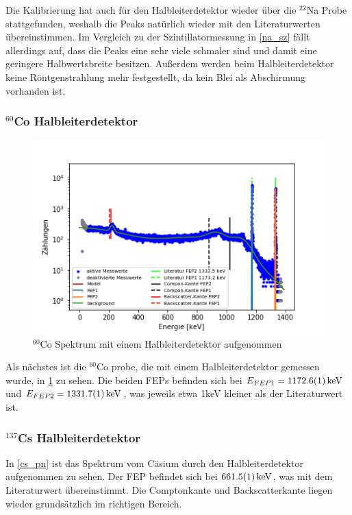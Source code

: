 Die Kalibrierung hat auch für den Halbleiterdetektor wieder über die $^{22}$Na Probe stattgefunden, weshalb die Peaks natürlich wieder mit den Literaturwerten übereinstimmen. Im Vergleich zu der Szintillatormessung in \cref{na_sz} fällt allerdings auf, dass die Peaks eine sehr viele schmaler sind und damit eine geringere Halbwertsbreite besitzen. Außerdem werden beim Halbleiterdetektor keine Röntgenstrahlung mehr festgestellt, da kein Blei als Abschirmung vorhanden ist.



\newpage
\subsubsection{$^{60}$Co Halbleiterdetektor}


\begin{figure}[ht]
	\centering
	\includegraphics[scale=0.8]{co_pn_.png}
	\caption{$^{60}$Co Spektrum mit einem Halbleiterdetektor aufgenommen}
	\label{co_pn}
\end{figure}


Als nächstes ist die $^{60}$Co probe, die mit einem Halbleiterdetektor gemessen wurde, in \cref{co_pn} zu sehen. Die beiden FEPs befinden sich bei $E_{FEP1} = \SI{1172,6 \pm 0,1}{keV}$ und $E_{FEP2} = \SI{1331,7 \pm 0,1}{keV}$, was jeweils etwa 1keV kleiner als der Literaturwert ist.

\newpage
\subsubsection{$^{137}$Cs Halbleiterdetektor}

In \cref{cs_pn} ist das Spektrum vom Cäsium durch den Halbleiterdetektor aufgenommen
zu sehen. Der FEP befindet sich bei $\SI{661,5 \pm 0,1}{keV}$, was mit dem Literaturwert übereinstimmt. Die Comptonkante und Backscatterkante liegen wieder grundsätzlich im richtigen Bereich.


